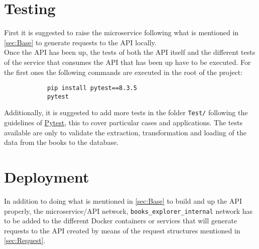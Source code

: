 \documentclass[12pt,a4paper]{article}
\begin{document}
    \section{Testing}
    {
        First it is suggested to raise the microservice following what is mentioned in \ref{sec:Base} 
        to generate requests to the API locally.\\

        Once the API has been up, the tests of both the API itself and the different tests of the 
        service that consumes the API that has been up have to be executed. For the first ones the 
        following commands are executed in the root of the project:

        \begin{verbatim}
            pip install pytest==8.3.5
            pytest
        \end{verbatim}

        Additionally, it is suggested to add more tests in the folder \verb*|Test/| following the guidelines 
        of \href{https://docs.pytest.org/en/stable/}{Pytest}, this to cover particular cases and applications. 
        The tests available are only to validate the extraction, transformation and loading of the data 
        from the books to the database.
    }

    \newpage

    \section{Deployment}
    {
        In addition to doing what is mentioned in \ref{sec:Base} to build and up the API properly, 
        the microservice/API network, \verb*|books_explorer_internal| network has to be added to 
        the different Docker containers or services that will generate requests to the API created 
        by means of the request structures mentioned in \ref{sec:Request}.
    }
\end{document}
